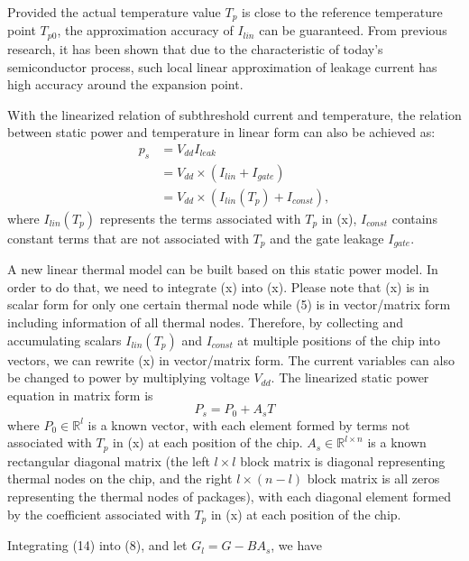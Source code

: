 Provided the actual temperature value $T_{p}$ is close to the reference temperature point $T_{p0}$, the approximation accuracy of $I_{lin}$ can be guaranteed. From previous research, it has been shown that due to the characteristic of today's semiconductor process, such local linear approximation of leakage current has high accuracy around the expansion point.

With the linearized relation of subthreshold current and temperature, the relation between static power and temperature in linear form can also be achieved as:
\begin{equation}\label{linear_static}
\begin{split}
p_{s} &= V_{dd}I_{leak}\\
&= V_{dd} \times (I_{lin}+I_{gate})\\
&= V_{dd} \times (I_{lin}(T_{p})+I_{const}),
\end{split}
\end{equation}
where $I_{lin}(T_{p})$ represents the terms associated with $T_{p}$ in (x), $I_{const}$ contains constant terms that are not associated with $T_{p}$ and the gate leakage $I_{gate}$.

A new linear thermal model can be built based on this static power model. In order to do that, we need to integrate (x) into (x). Please note that (x) is in scalar form for only one certain thermal node while (5) is in vector/matrix form including information of all thermal nodes. Therefore, by collecting and accumulating scalars $I_{lin}(T_{p})$ and $I_{const}$ at multiple positions of the chip into vectors, we can rewrite (x) in vector/matrix form. The current variables can also be changed to power by multiplying voltage $V_{dd}$. The linearized static power equation in matrix form is
\begin{equation}\label{linear_static_matrix}
P_{s} = P_{0}+A_{s}T
\end{equation}
where $P_{0} \in \mathbb{R}^{l}$ is a known vector, with each element formed by terms not associated with $T_{p}$ in (x) at each position of the chip. $A_{s} \in \mathbb{R}^{l \times n}$ is a known rectangular diagonal matrix (the left $l \times l$ block matrix is diagonal representing thermal nodes on the chip, and the right $l \times (n-l)$ block matrix is all zeros representing the thermal nodes of packages), with each diagonal element formed by the coefficient associated with $T_{p}$ in (x) at each position of the chip.

Integrating (14) into (8), and let $G_{l} = G - BA_{s}$, we have

